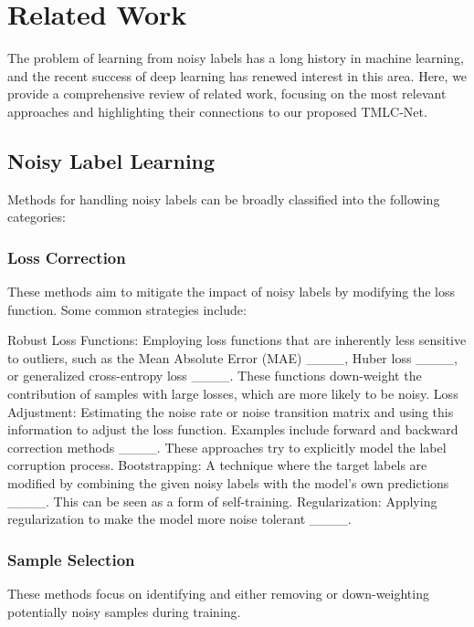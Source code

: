 \section{Related Work}
\label{sec:related_work}

The problem of learning from noisy labels has a long history in machine learning, and the recent success of deep learning has renewed interest in this area.  Here, we provide a comprehensive review of related work, focusing on the most relevant approaches and highlighting their connections to our proposed TMLC-Net.

\subsection{Noisy Label Learning}
\label{sec:related_noisy}

Methods for handling noisy labels can be broadly classified into the following categories:

\subsubsection{Loss Correction}
\label{sec:related_noisy_loss}

These methods aim to mitigate the impact of noisy labels by modifying the loss function.  Some common strategies include:

Robust Loss Functions: Employing loss functions that are inherently less sensitive to outliers, such as the Mean Absolute Error (MAE) ____, Huber loss ____, or generalized cross-entropy loss ____. These functions down-weight the contribution of samples with large losses, which are more likely to be noisy.
Loss Adjustment:  Estimating the noise rate or noise transition matrix and using this information to adjust the loss function. Examples include forward and backward correction methods ____. These approaches try to explicitly model the label corruption process.
Bootstrapping:  A technique where the target labels are modified by combining the given noisy labels with the model's own predictions ____. This can be seen as a form of self-training.
Regularization: Applying regularization to make the model more noise tolerant ____.

\subsubsection{Sample Selection}
\label{sec:related_noisy_sample}

These methods focus on identifying and either removing or down-weighting potentially noisy samples during training.

